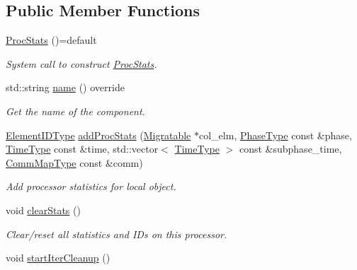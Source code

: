 \subsection*{Public Member Functions}
\begin{DoxyCompactItemize}
\item 
\hyperlink{structvt_1_1vrt_1_1collection_1_1balance_1_1_proc_stats_aa3495f8e610964b594e6dc4d3998d5b2}{Proc\+Stats} ()=default
\begin{DoxyCompactList}\small\item\em System call to construct {\ttfamily \hyperlink{structvt_1_1vrt_1_1collection_1_1balance_1_1_proc_stats}{Proc\+Stats}}. \end{DoxyCompactList}\item 
std\+::string \hyperlink{structvt_1_1vrt_1_1collection_1_1balance_1_1_proc_stats_a19a950a19ad62c0dddff07d50d060114}{name} () override
\begin{DoxyCompactList}\small\item\em Get the name of the component. \end{DoxyCompactList}\item 
\hyperlink{namespacevt_1_1vrt_1_1collection_1_1balance_a14c8d2c972f2913aa3f1636e5be0a120}{Element\+I\+D\+Type} \hyperlink{structvt_1_1vrt_1_1collection_1_1balance_1_1_proc_stats_a21164188d5d1d09724959e95e5c4f2e4}{add\+Proc\+Stats} (\hyperlink{structvt_1_1vrt_1_1collection_1_1_migratable}{Migratable} $\ast$col\+\_\+elm, \hyperlink{namespacevt_a46ce6733d5cdbd735d561b7b4029f6d7}{Phase\+Type} const \&phase, \hyperlink{namespacevt_a876a9d0cd5a952859c72de8a46881442}{Time\+Type} const \&time, std\+::vector$<$ \hyperlink{namespacevt_a876a9d0cd5a952859c72de8a46881442}{Time\+Type} $>$ const \&subphase\+\_\+time, \hyperlink{namespacevt_1_1vrt_1_1collection_1_1balance_a10860c956804d644db54a16012352728}{Comm\+Map\+Type} const \&comm)
\begin{DoxyCompactList}\small\item\em Add processor statistics for local object. \end{DoxyCompactList}\item 
void \hyperlink{structvt_1_1vrt_1_1collection_1_1balance_1_1_proc_stats_a9a47e5d00d2645f76f2a21e75996fe8b}{clear\+Stats} ()
\begin{DoxyCompactList}\small\item\em Clear/reset all statistics and I\+Ds on this processor. \end{DoxyCompactList}\item 
void \hyperlink{structvt_1_1vrt_1_1collection_1_1balance_1_1_proc_stats_a6b8af21b777599060c4a532a5adb0100}{start\+Iter\+Cleanup} ()

\end{DoxyCompactItemize}
